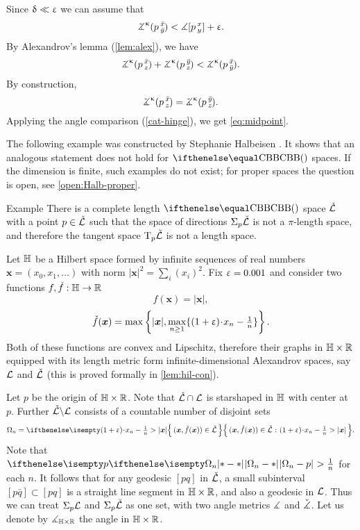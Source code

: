 Since $\updelta\ll \upvarepsilon$  we can assume that 
\[\angk\kappa p{\bar x}{\bar y}<\mangle \hinge pxy+\eps.\]
By  Alexandrov's lemma (\ref{lem:alex}), we have
\[\angk\kappa p{\bar x}{z}+\angk\kappa p{\bar y}{z}< \angk\kappa p{\bar x}{\bar y}.\]
By construction,
\[\angk\kappa p{\bar x}{z}=\angk\kappa p{\bar y}{z}.\]
Applying the angle comparison (\ref{cat-hinge}), we get \ref{eq:midpoint}.
\qeds

The following example was constructed by Stephanie Halbeisen \cite{halbeisen}.
It shows that an analogous statement does not hold for $\Alex{}$ spaces.
If the dimension is finite, such examples do not exist; %
for proper spaces the question is open, see \ref{open:Halb-proper}.

\begin{thm}{Example}\label{Halbeisen's example}
There is a complete length $\Alex{}$ space $\check{\mathcal{L}}$
with a point $p\in\check{\spc{L}}$ such that the space of directions $\Sigma_p\check{\mathcal{L}}$ is not a $\pi$-length space, and therefore the tangent space $\text{\rm T}_p\check{\mathcal{L}}$ is not a length space. 
\end{thm}



Let $\mathbb{H}$ be a Hilbert space formed by infinite sequences of real numbers $\bm{x}=(x_0,x_1,\dots)$ with norm
$|\bm{x}|^2=\sum_i(x_i)^2$. 
Fix $\upvarepsilon=0.001$ and consider two functions $f,\check f:\HH\to\RR$
\[f(\bm{x})=|\bm{x}|,\]
\[\check f(\bm{x})
=
\max\left\{|\bm{x}|,\max_{n\ge1}\{(1+\eps)\cdot x_n-\tfrac{1}{n}\}\right\}.\] 
Both of these functions are convex and Lipschitz, therefore their graphs in $\HH\times \RR$ equipped with its length metric form infinite-dimensional Alexandrov spaces, say $\mathcal{L}$  and $\check{\mathcal{L}}$ (this is proved formally in \ref{lem:hil-con}).

Let $p$ be the origin of $\HH\times \RR$.
Note that $\check{\spc{L}}\cap\spc{L}$ is starshaped in $\mathbb{H}$ with center at $p$.
Further $\check{\mathcal{L}}\backslash\mathcal{L}$ consists of a countable number of disjoint sets
\[\Omega_n=\set{(\bm{x},\check f(\bm{x}))\in\check{\spc{L}}}{(1+\eps)\cdot x_n-\tfrac{1}{n}>|\bm{x}|}.\]
Note that $\dist{\Omega_n}{p}{}>\tfrac{1}{n}$ for each $n$.
It follows that for any geodesic $[p q]$ in $\check{\mathcal{L}}$,
a small subinterval $[p \bar q]\subset [p q]$ 
is a straight line segment in $\HH\times\RR$, 
and also a geodesic in $\mathcal{L}$.
Thus we can treat $\Sigma_p\mathcal{L}$ and $\Sigma_p\check{\mathcal{L}}$ as one set, with two angle metrics $\measuredangle$ and $\check{\measuredangle}$.
Let us denote by $\mangle_{\HH\times \RR}$ the angle in $\HH\times\RR$.

